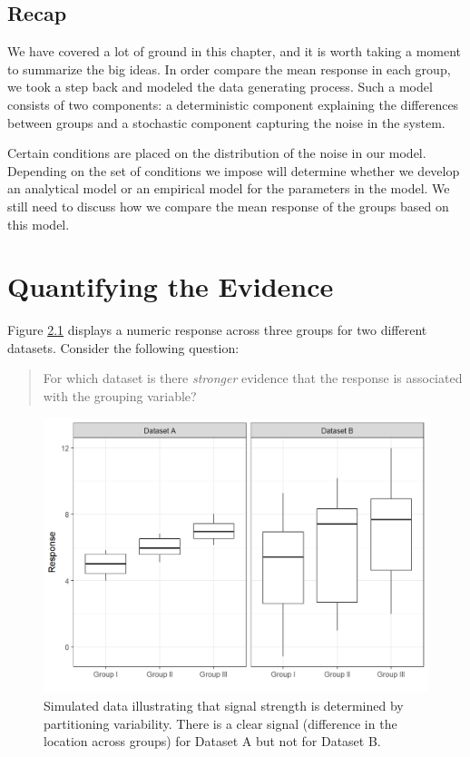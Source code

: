 \documentclass[]{book}
\theoremstyle{plain}
\theoremstyle{mydefn}
\theoremstyle{myexmpl}
\theoremstyle{remark}
\begin{document}
\section{Recap}\label{recap-1}

We have covered a lot of ground in this chapter, and it is worth taking
a moment to summarize the big ideas. In order compare the mean response
in each group, we took a step back and modeled the data generating
process. Such a model consists of two components: a deterministic
component explaining the differences between groups and a stochastic
component capturing the noise in the system.

Certain conditions are placed on the distribution of the noise in our
model. Depending on the set of conditions we impose will determine
whether we develop an analytical model or an empirical model for the
parameters in the model. We still need to discuss how we compare the
mean response of the groups based on this model.

\chapter{Quantifying the Evidence}\label{ANOVAteststat}

Figure \ref{fig:anovateststat-boxplots} displays a numeric response
across three groups for two different datasets. Consider the following
question:

\begin{quote}
For which dataset is there \emph{stronger} evidence that the response is
associated with the grouping variable?
\end{quote}

\begin{figure}

{\centering \includegraphics[width=0.8\linewidth]{./Images/anovateststat-boxplots-1} 

}

\caption{Simulated data illustrating that signal strength is determined by partitioning variability. There is a clear signal (difference in the location across groups) for Dataset A but not for Dataset B.}\label{fig:anovateststat-boxplots}
\end{figure}
\end{document}
